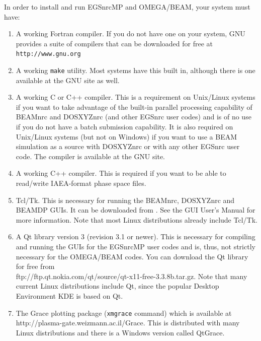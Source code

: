 \documentclass[12pt,twoside]{article}
\begin{document}
In order to install and run EGSnrcMP and OMEGA/BEAM, your system must have:
\begin{enumerate}
\item A working Fortran compiler.  If you do not have one on
your system, GNU provides a suite of compilers that can be downloaded
for free at {\tt http://www.gnu.org}
\item A working {\tt make} utility.  Most systems have this built in, although
there is one available at the GNU site as well.
\item A working C or C++ compiler.  This is a requirement on Unix/Linux
systems if you want to take advantage of
the built-in parallel processing capability of BEAMnrc and DOSXYZnrc
(and other EGSnrc user codes) and is of no use if you do not
have a batch submission capability.  It is also required on Unix/Linux
systems (but not on Windows) if you want to use a BEAM simulation as a
source with DOSXYZnrc or with any other EGSnrc user code.
The compiler is available at the GNU site.
\item A working C++ compiler.  This is required if you want to be
able to read/write IAEA-format phase space files.
\item Tcl/Tk.  This is necessary for running the BEAMnrc, DOSXYZnrc and
BEAMDP GUIs.  It can be downloaded from
.  See the GUI User's Manual\cite{Tr04} for
more information.  Note that most Linux distributions already include
Tcl/Tk.
\item A Qt library version 3 (revision 3.1 or newer). This is necessary for
compiling and running the GUIs for the EGSnrcMP user codes and is, thus,
not strictly necessary for the OMEGA/BEAM codes.  You can download
the Qt library for free from\\
{ftp://ftp.qt.nokia.com/qt/source/qt-x11-free-3.3.8b.tar.gz}.  Note that many current Linux distributions
include Qt, since the popular Desktop Environment KDE is based on Qt.

\item The Grace plotting package ({\tt xmgrace} command) which is available at\\
 {http://plasma-gate.weizmann.ac.il/Grace}. This is distributed with many
Linux distributions and there is a Windows version called QtGrace.
\end{enumerate}
\end{document}
